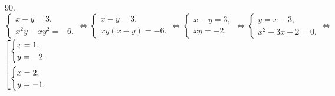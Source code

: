 90. $\begin{cases}
x-y=3,\\
x^2y-xy^2=-6.
\end{cases}\Leftrightarrow\begin{cases}
x-y=3,\\
xy(x-y)=-6.
\end{cases}\Leftrightarrow\begin{cases}
x-y=3,\\
xy=-2.
\end{cases}\Leftrightarrow
\begin{cases}
y=x-3,\\
x^2-3x+2=0.
\end{cases}\Leftrightarrow$\\$\left[
      \begin{gathered} \begin{cases}x=1,\\ y=-2.\end{cases}\hfill\\
      \begin{cases}x=2,\\ y=-1.\end{cases}\hfill \end{gathered}\right.$\\
